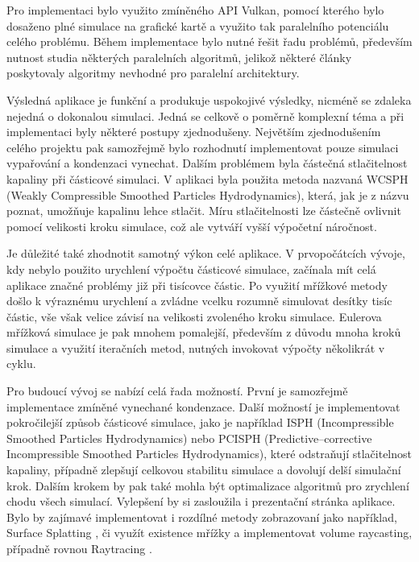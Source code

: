 Pro implementaci bylo využito zmíněného API Vulkan, pomocí kterého bylo dosaženo plné simulace na grafické kartě a využito tak paralelního potenciálu celého problému. Během implementace bylo nutné řešit řadu problémů, především nutnost studia některých paralelních algoritmů, jelikož některé články poskytovaly algoritmy nevhodné pro paralelní architektury.

Výsledná aplikace je funkční a produkuje uspokojivé výsledky, nicméně se zdaleka nejedná o dokonalou simulaci. Jedná se celkově o poměrně komplexní téma a při implementaci byly některé postupy zjednodušeny. Největším zjednodušením celého projektu pak samozřejmě bylo rozhodnutí implementovat pouze simulaci vypařování a kondenzaci vynechat. Dalším problémem byla částečná stlačitelnost kapaliny při částicové simulaci. V aplikaci byla použita metoda nazvaná WCSPH (Weakly Compressible Smoothed Particles Hydrodynamics), která, jak je z názvu poznat, umožňuje kapalinu lehce stlačit. Míru stlačitelnosti lze částečně ovlivnit pomocí velikosti kroku simulace, což ale vytváří vyšší výpočetní náročnost. 

Je důležité také zhodnotit samotný výkon celé aplikace. V prvopočátcích vývoje, kdy nebylo použito urychlení výpočtu částicové simulace, začínala mít celá aplikace značné problémy již při tisícovce částic. Po využití mřížkové metody došlo k výraznému urychlení a zvládne vcelku rozumně simulovat desítky tisíc částic, vše však velice závisí na velikosti zvoleného kroku simulace. Eulerova mřížková simulace je pak mnohem pomalejší, především z důvodu mnoha kroků simulace a využití iteračních metod, nutných invokovat výpočty několikrát v cyklu.

Pro budoucí vývoj se nabízí celá řada možností. První je samozřejmě implementace zmíněné vynechané kondenzace. Další možností je implementovat pokročilejší způsob částicové simulace, jako je například ISPH (Incompressible Smoothed Particles Hydrodynamics) nebo PCISPH (Predictive–corrective Incompressible Smoothed Particles Hydrodynamics), které odstraňují stlačitelnost kapaliny, případně zlepšují celkovou stabilitu simulace a dovolují delší simulační krok. Dalším krokem by pak také mohla být optimalizace algoritmů pro zrychlení chodu všech simulací. Vylepšení by si zasloužila i prezentační stránka aplikace. Bylo by zajímavé implementovat i rozdílné metody zobrazovaní jako například, Surface Splatting \cite{surfSplat}, či využít existence mřížky a implementovat volume raycasting, případně rovnou Raytracing \cite{volumeRT}. 




